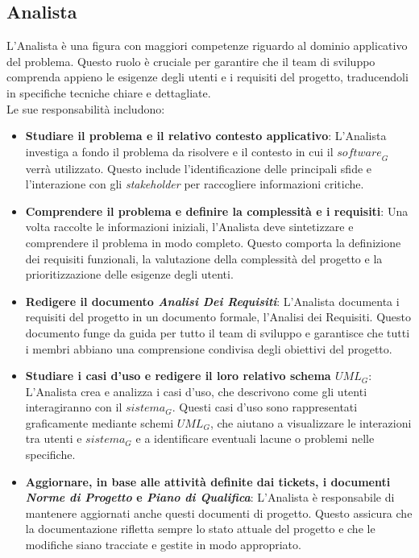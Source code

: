 \subsection{Analista}
L'Analista è una figura con maggiori competenze riguardo al dominio applicativo del problema. Questo ruolo è cruciale per garantire che il team di sviluppo comprenda appieno le esigenze degli utenti e i requisiti del progetto, traducendoli in specifiche tecniche chiare e dettagliate.\\
Le sue responsabilità includono:
\begin{itemize}
    \item \textbf{Studiare il problema e il relativo contesto applicativo}: L'Analista investiga a fondo il problema da risolvere e il contesto in cui il $\textit{software}_G$ verrà utilizzato. Questo include l'identificazione delle principali sfide e l'interazione con gli \textit{stakeholder} per raccogliere informazioni critiche.
    \item \textbf{Comprendere il problema e definire la complessità e i requisiti}: Una volta raccolte le informazioni iniziali, l'Analista deve sintetizzare e comprendere il problema in modo completo. Questo comporta la definizione dei requisiti funzionali, la valutazione della complessità del progetto e la prioritizzazione delle esigenze degli utenti.
    \item \textbf{Redigere il documento \textit{Analisi Dei Requisiti}}: L'Analista documenta i requisiti del progetto in un documento formale, l'Analisi dei Requisiti. Questo documento funge da guida per tutto il team di sviluppo e garantisce che tutti i membri abbiano una comprensione condivisa degli obiettivi del progetto.
    \item \textbf{Studiare i casi d'uso e redigere il loro relativo schema $\textit{UML}_G$}: L'Analista crea e analizza i casi d'uso, che descrivono come gli utenti interagiranno con il $\textit{sistema}_G$. Questi casi d'uso sono rappresentati graficamente mediante schemi $\textit{UML}_G$, che aiutano a visualizzare le interazioni tra utenti e $\textit{sistema}_G$ e a identificare eventuali lacune o problemi nelle specifiche.
    \item \textbf{Aggiornare, in base alle attività definite dai tickets, i documenti \textit{Norme di Progetto} e \textit{Piano di Qualifica}}: L'Analista è responsabile di mantenere aggiornati anche questi documenti di progetto. Questo assicura che la documentazione rifletta sempre lo stato attuale del progetto e che le modifiche siano tracciate e gestite in modo appropriato.
\end{itemize}

